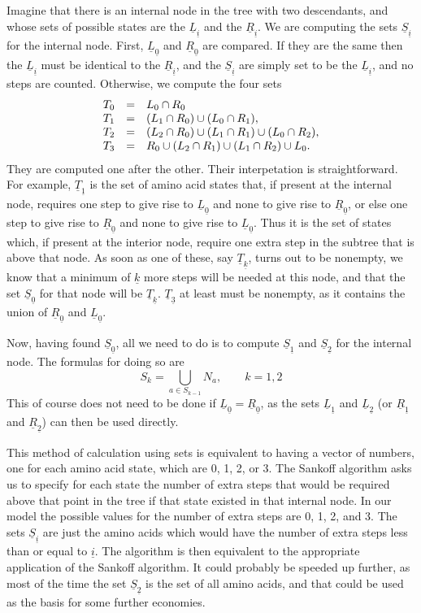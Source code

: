 \documentclass[12pt]{article}
\def\ul{\underline}
\begin{document}
Imagine that there is an internal node in the tree with two descendants,
and whose sets of possible states are the $\ul{L}_{\ul{i}}$ and the $\ul{R}_{\ul{i}}$.
We are computing the sets $\ul{S}_{\ul{i}}$ for the internal node.  First, $\ul{L}_{\ul{0}}$ and $\ul{R}_{\ul{0}}$ are
compared.  If they are the same then the $\ul{L}_{\ul{i}}$ must be identical to the $\ul{R}_{\ul{i}}$,
and the $\ul{S}_{\ul{i}}$ are simply set to be the $\ul{L}_{\ul{i}}$, and no steps are counted.
Otherwise, we compute the four sets
\begin{equation}
\begin{array}{c c l}
T_0 & = & L_0 \cap R_0\\
T_1 & = &(L_1 \cap R_0) \cup (L_0 \cap R_1),\\
T_2 & = &(L_2 \cap R_0) \cup (L_1 \cap R_1)\cup (L_0 \cap R_2),\\
T_3 & = &R_0 \cup (L_2 \cap R_1) \cup (L_1 \cap R_2) \cup L_0.
\end{array}
\end{equation}
\noindent
They are
computed one after the other.
Their interpetation is straightforward.  For example, $\ul{T}_{\ul{1}}$ is the set of
amino acid states that, if present at the internal node, requires one
step to give rise to $\ul{L}_{\ul{0}}$ and none to give rise to $\ul{R}_{\ul{0}}$, or else
one step to give rise to $\ul{R}_{\ul{0}}$ and none to give rise to $\ul{L}_{\ul{0}}$.  Thus it
is the set of states which, if present at the interior node, require one
extra step in the subtree that is above that node.
As soon as one of these, say $\ul{T}_{\ul{k}}$, turns out to be nonempty, we know that
a minimum of $\ul{k}$ more steps will be needed at this node, and that the set $\ul{S}_{\ul{0}}$ for that node will be
$\ul{T}_{\ul{k}}$.   $\ul{T}_{\ul{3}}$ at least must be nonempty, as it contains the union of
$\ul{R}_{\ul{0}}$ and $\ul{L}_{\ul{0}}$.

Now, having found $\ul{S}_{\ul{0}}$, all we need to do is to compute $\ul{S}_{\ul{1}}$ and $\ul{S}_{\ul{2}}$ for the internal node.  The formulas
for doing so are
\begin{equation}
S_k = \bigcup_{a \in S_{k-1}} N_a, \qquad k = 1, 2
\end{equation}
This of course does not need to be done if $\ul{L}_{\ul{0}} = \ul{R}_{\ul{0}}$, as the sets $\ul{L}_{\ul{1}}$
and $\ul{L}_{\ul{2}}$ (or $\ul{R}_{\ul{1}}$ and $\ul{R}_{\ul{2}}$) can then be used directly.
   
This method of calculation using sets is equivalent to having a vector of
numbers, one for each amino acid state, which are 0, 1, 2, or 3.
The Sankoff
algorithm asks us to specify for each state the number of extra steps that
would be required above that point in the tree if that state existed in
that internal node.  In our model the possible values for the number of
extra steps are 0, 1, 2, and 3.  The sets
$\ul{S}_{\ul{i}}$ are just the amino acids which would have the number of extra steps less than or equal to $\ul{i}$.
The algorithm is then equivalent to the appropriate application of the
Sankoff algorithm.  It could probably be speeded up further, as most of the
time the set $\ul{S}_{\ul{2}}$ is the set of all amino acids, and that could be used as
the basis for some further economies.
\end{document}
